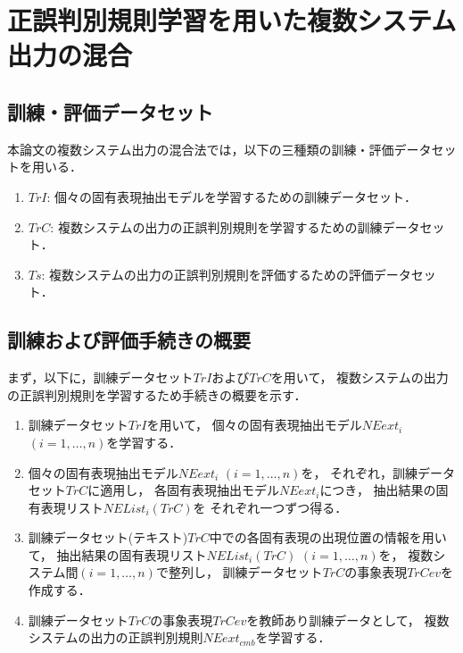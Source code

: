 \section{正誤判別規則学習を用いた複数システム出力の混合}
\label{sec:combi}

\subsection{訓練・評価データセット}
\label{subsec:trts}

本論文の複数システム出力の混合法では，以下の三種類の訓練・評価データセットを用いる．
\begin{enumerate}
\item $TrI$: 個々の固有表現抽出モデルを学習するための訓練データセット．
\item $TrC$: 複数システムの出力の正誤判別規則を学習するための訓練データセット．
\item $Ts$: 複数システムの出力の正誤判別規則を評価するための評価データセット．
\end{enumerate}

\subsection{訓練および評価手続きの概要}
\label{subsec:proc}

まず，以下に，訓練データセット$TrI$および$TrC$を用いて，
複数システムの出力の正誤判別規則を学習するため手続きの概要を示す．
\begin{enumerate}
\item 訓練データセット$TrI$を用いて，
	個々の固有表現抽出モデル$NEext_i$ $(i=1,\ldots,n)$を学習する．
\item 個々の固有表現抽出モデル$NEext_i$ $(i=1,\ldots,n)$を，
	それぞれ，訓練データセット$TrC$に適用し，
	各固有表現抽出モデル$NEext_i$につき，
	抽出結果の固有表現リスト$NEList_i(TrC)$を
	それぞれ一つずつ得る．
\item 訓練データセット(テキスト)$TrC$中での各固有表現の出現位置の情報を用いて，
	抽出結果の固有表現リスト$NEList_i(TrC)$ $(i\!=\!1,\ldots,n)$を，
	複数システム間$(i\!=\!1,\ldots,n)$で整列し，
	訓練データセット$TrC$の事象表現$TrCev$を作成する．
\item 訓練データセット$TrC$の事象表現$TrCev$を教師あり訓練データとして，
	複数システムの出力の正誤判別規則$NEext_{cmb}$を学習する．
\end{enumerate}

